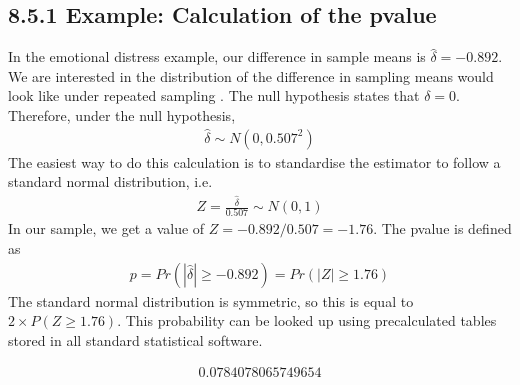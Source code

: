 \documentclass[letterpaper,10pt,english]{jupyterBook}
\begin{document}
\subsection{8.5.1 Example: Calculation of the p\sphinxhyphen{}value}
\label{\detokenize{08.f. Frequentist II:example-calculation-of-the-p-value}}
\sphinxAtStartPar
In the emotional distress example, our difference in sample means is \(\hat{\delta} = -0.892\).
We are interested in the distribution of the difference in sampling means would look like under repeated sampling . The null hypothesis states that \(\delta = 0\). Therefore, under the null hypothesis,
\begin{equation*}
\begin{split}
\hat{\delta} \sim  N(0,  0.507^2) 
\end{split}
\end{equation*}
\sphinxAtStartPar
The easiest way to do this calculation is to standardise the estimator to follow a standard normal distribution, i.e.
\begin{equation*}
\begin{split}
Z = \frac{\hat{\delta}}{0.507} \sim  N(0, 1) 
\end{split}
\end{equation*}
\sphinxAtStartPar
In our sample, we get a value of \(Z=-0.892/0.507 = -1.76\). The p\sphinxhyphen{}value is defined as
\begin{equation*}
\begin{split}
p = Pr( | \hat{\delta} | \geq  -0.892) = Pr( | Z | \geq   1.76)
\end{split}
\end{equation*}
\sphinxAtStartPar
The standard normal distribution is symmetric, so this is equal to \(2 \times P(Z \geq 1.76)\). This probability can be looked up using pre\sphinxhyphen{}calculated tables stored in all standard statistical software.

\begin{sphinxVerbatim}[commandchars=\\\{\}]
\end{sphinxVerbatim}
\begin{equation*}
\begin{split}0.0784078065749654\end{split}
\end{equation*}
\end{document}
